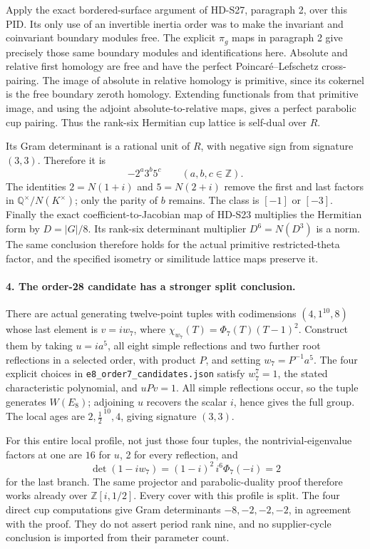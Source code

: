 Apply the exact bordered-surface argument of HD-S27, paragraph 2,
over this PID. Its only use of an invertible inertia order was to
make the invariant and coinvariant boundary modules free. The
explicit \(\pi_g\) maps in paragraph 2 give precisely those
same boundary modules and identifications here. Absolute and
relative first homology are free and have the perfect
Poincar\'e--Lefschetz cross-pairing. The image of absolute in
relative homology is primitive, since its cokernel is the free
boundary zeroth homology. Extending functionals from that primitive
image, and using the adjoint absolute-to-relative maps, gives a
perfect parabolic cup pairing. Thus the rank-six Hermitian cup
lattice is self-dual over \(R\).

Its Gram determinant is a rational unit of \(R\), with negative
sign from signature \((3,3)\). Therefore it is
\[
                         -2^a3^b5^c\qquad(a,b,c\in\mathbb Z).
\]
The identities \(2=N(1+i)\) and \(5=N(2+i)\) remove the first
and last factors in \(\mathbb Q^\times/N(K^\times)\); only the
parity of \(b\) remains. The class is \([-1]\) or \([-3]\).
Finally the exact coefficient-to-Jacobian map of HD-S23 multiplies
the Hermitian form by \(D=|G|/8\). Its rank-six determinant
multiplier \(D^6=N(D^3)\) is a norm. The same conclusion therefore
holds for the actual primitive restricted-theta factor, and the
specified isometry or similitude lattice maps preserve it.

\paragraph{4. The order-28 candidate has a stronger split conclusion.}
There are actual generating twelve-point tuples with codimensions
\((4,1^{10},8)\) whose last element is \(v=iw_7\), where
\(\chi_{w_7}(T)=\Phi_7(T)(T-1)^2\). Construct them by taking
\(u=ia^5\), all eight simple reflections and two further root
reflections in a selected order, with product \(P\), and setting
\(w_7=P^{-1}a^5\). The four explicit choices in
\texttt{e8\_order7\_candidates.json} satisfy \(w_7^7=1\), the
stated characteristic polynomial, and \(uPv=1\). All simple
reflections occur, so the tuple generates \(W(E_8)\); adjoining
\(u\) recovers the scalar \(i\), hence gives the full group.
The local ages are \(2,\tfrac12^{\,10},4\), giving signature
\((3,3)\).

For this entire local profile, not just those four tuples, the
nontrivial-eigenvalue factors at one are \(16\) for \(u\),
2 for every reflection, and
\[
 \det(1-iw_7)=(1-i)^2\,i^6\Phi_7(-i)=2
\]
for the last branch. The same projector and parabolic-duality proof
therefore works already over \(\mathbb Z[i,1/2]\). Every cover
with this profile is split. The four direct cup computations give
Gram determinants \(-8,-2,-2,-2\), in agreement with the proof.
They do not assert period rank nine, and no supplier-cycle conclusion
is imported from their parameter count.

